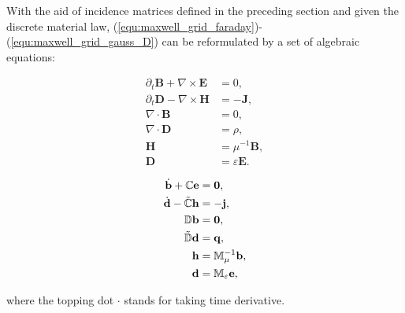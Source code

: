 \documentclass{article}
\begin{document}
With the aid of incidence matrices defined in the preceding section and given the discrete material law, (\ref{equ:maxwell_grid_faraday})-(\ref{equ:maxwell_grid_gauss_D}) can be reformulated by a set of algebraic equations:
\begin{center}
\vspace{-0.5cm}
\begin{minipage}{0.3\textwidth}
\begin{align*}
    \partial_t \mathbf{B} + \nabla \times \mathbf{E} &= 0, \\
    \partial_t \mathbf{D} - \nabla \times \mathbf{H} &= -\mathbf{J}, \\
    \nabla \cdot \mathbf{B} &= 0,  \\
    \nabla \cdot \mathbf{D} &= \rho, \\
    \mathbf{H} &= \mu^{-1} \mathbf{B}, \\
    \mathbf{D} &= \varepsilon \mathbf{E}. 
\end{align*}
\end{minipage}
\begin{minipage}{0.1\textwidth}
\centering
{}
\end{minipage}
\begin{minipage}{0.3\textwidth}
\begin{subequations}
\begin{align}
    \dot{\mathbf{b}} + \mathbb{C}\mathbf{e} &= \mathbf{0} , \label{equ:alg_faraday}\\
    \dot{\mathbf{d}} - \Tilde{\mathbb{C}}\mathbf{h} &= - \mathbf{j}, \label{equ:alg_empere}\\
    \mathbb{D}\mathbf{b} &= \mathbf{0},  \label{equ:alg_gauss_b}\\
    \Tilde{\mathbb{D}}\mathbf{d} &= \mathbf{q},  \label{equ:alg_gauss_d}\\
    \mathbf{h} &= \mathbb{M}_\mu^{-1} \mathbf{b}, \label{equ:alg_material_magnetic}\\
    \mathbf{d} &= \mathbb{M}_{\varepsilon} \mathbf{e}, \label{equ:alg_material_electric} 
\end{align}
\end{subequations}
\end{minipage}
\end{center}
where the topping dot $\cdot$ stands for taking time derivative.
\end{document}
